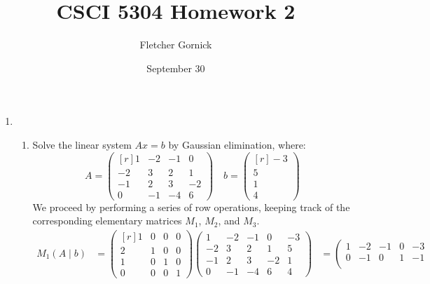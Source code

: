 \documentclass[11pt]{article}
\title{\vspace{-1.0cm}CSCI 5304 Homework 2 }
\author{Fletcher Gornick}
\date{September 30}
\begin{document}
\maketitle
\begin{enumerate}
	\item \begin{enumerate}
		      \item Solve the linear system \(Ax = b\) by Gaussian elimination, where:
		            \[A =
			            \begin{pmatrix*}[r]
				            1  & -2 & -1 & 0  \\
				            -2 & 3  & 2  & 1  \\
				            -1 & 2  & 3  & -2 \\
				            0  & -1 & -4 & 6
			            \end{pmatrix*}
			            \quad b = \begin{pmatrix*}[r] -3 \\ 5 \\ 1 \\ 4 \end{pmatrix*}
		            \]
		            We proceed by performing a series of row operations, keeping track of the corresponding elementary matrices \(M_1\), \(M_2\), and \(M_3\).
		            \begin{align*}
			            M_1 (A \mid b)         & =
			            \begin{pmatrix*}[r]
				            1 & 0 & 0 & 0 \\
				            2 & 1 & 0 & 0 \\
				            1 & 0 & 1 & 0 \\
				            0 & 0 & 0 & 1
			            \end{pmatrix*}
			            \left(\begin{array}{rrrr|r}
					                  1  & -2 & -1 & 0  & -3 \\
					                  -2 & 3  & 2  & 1  & 5  \\
					                  -1 & 2  & 3  & -2 & 1  \\
					                  0  & -1 & -4 & 6  & 4
				                  \end{array}\right)
			                                   & =
			            \left(\begin{array}{rrrr|r}
					                  1 & -2 & -1 & 0  & -3 \\
					                  0 & -1 & 0  & 1  & -1 \\

\end{array}
\end{align*}
\end{enumerate}
\end{enumerate}
\end{document}
